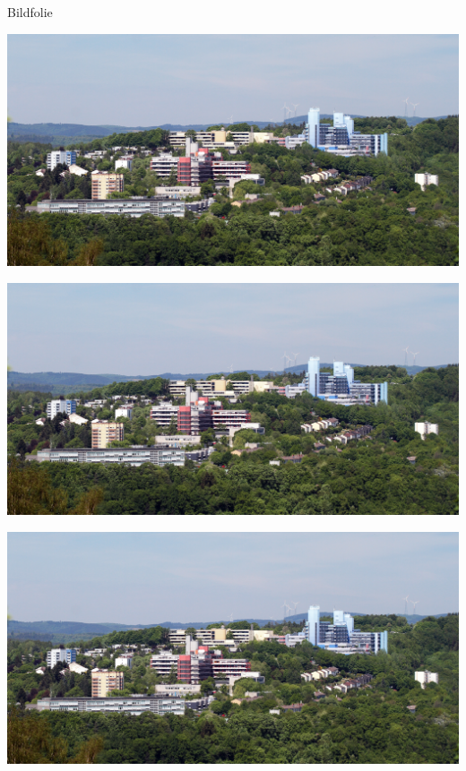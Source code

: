 \documentclass[aspectratio=169]{beamer}
\begin{document}
\begin{frame}{Bildfolie}
	\begin{minipage}{.31\textwidth}
		\includegraphics[width=\textwidth]{img/progress.jpg}
		
	\end{minipage}
	\hfill
	\begin{minipage}{.31\textwidth}
		\includegraphics[width=\textwidth]{img/progress.jpg}
		
	\end{minipage}
	\hfill
	\begin{minipage}{.31\textwidth}
		\includegraphics[width=\textwidth]{img/progress.jpg}
		
	\end{minipage}
\end{frame}
\end{document}
